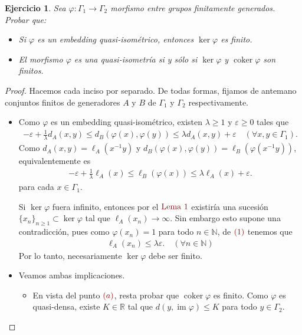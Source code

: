 \documentclass[11pt]{article}
\theoremstyle{colored}
\newtheorem{exercise}{Ejercicio}
\newcommand{\N}{\mathbb{N}}
\newcommand{\R}{\mathbb{R}}
\newcommand{\im}{\operatorname{im}}
\newcommand{\coker}{\operatorname{coker}}
\newcommand{\paint}[1]{\color{color}{#1}}
\begin{document}
\setcounter{exercise}{5}
\begin{exercise} Sea $\varphi : \Gamma_1 \to \Gamma_2$ morfismo entre grupos finitamente generados. Probar que:
\begin{itemize}
\item[a)] Si $\varphi$ es un embedding quasi-isométrico, entonces $\ker \varphi$ es finito.
\item[b)] El morfismo $\varphi$ es una quasi-isometría si y sólo si $\ker \varphi$ y $\coker \varphi$ son finitos.
\end{itemize}
\end{exercise}
\begin{proof} Hacemos cada inciso por separado. De todas formas, fijamos de antemano conjuntos finitos de generadores $A$ y $B$ de $\Gamma_1$ y $\Gamma_2$ respectivamente.  
\begin{itemize}[listparindent = \parindent]
\item[a)] Como $\varphi$ es un embedding quasi-isométrico, existen $\lambda \geq 1$ y $\varepsilon \geq 0$ tales que
\begin{align*}
-\varepsilon + \frac{1}{\lambda}d_A(x,y) \leq d_B(\varphi(x),\varphi(y)) \leq \lambda d_A(x,y) + \varepsilon \quad (\forall x,y \in \Gamma_1).
\end{align*}
Como $d_A(x,y) = \ell_A(x^{-1}y)$ y $d_B(\varphi(x),\varphi(y)) = \ell_B(\varphi(x^{-1}y))$, equivalentemente es
\begin{align}
-\varepsilon + \frac{1}{\lambda}\ell_A(x) \leq \ell_B(\varphi(x)) \leq \lambda \ell_A(x) + \varepsilon.
\end{align}
para cada $x \in \Gamma_1$.

Si $\ker \varphi$ fuera infinito, entonces por el $\paint{\text{Lema $1$}}$ existiría una sucesión $\{x_n\}_{n \geq 1} \subset \ker \varphi$ tal que $\ell_A(x_n) \to \infty$. Sin embargo esto supone una contradicción, pues como $\varphi(x_n) = 1$ para todo $n \in \N$, de $\paint{(1)}$ tenemos que
\begin{align*}
\ell_A(x_n) \leq \lambda\varepsilon. \quad (\forall n \in \N)
\end{align*}
Por lo tanto, necesariamente $\ker \varphi$ debe ser finito.
\item[b)] Veamos ambas implicaciones.
\begin{itemize}[listparindent = \parindent]
\item[($\Rightarrow$)] En vista del punto $\paint{(a)}$, resta probar que $\coker \varphi$ es finito. Como $\varphi$ es quasi-densa, existe $K \in \R$ tal que $d(y,\im \varphi) \leq K$ para todo $y \in \Gamma_2$. 


\end{itemize}
\end{itemize}
\end{proof}
\end{document}
